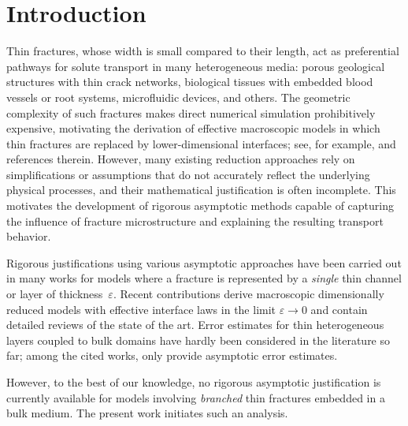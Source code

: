 \documentclass[reqno]{amsart}            %
\numberwithin{equation}{section}
\begin{document}
		
	
	
	\maketitle
	\tableofcontents
	
	
	
	\section{Introduction}
	
	Thin fractures, whose width is small compared to their length, act as preferential pathways for solute transport in many heterogeneous media: porous geological structures with thin crack networks, biological tissues with embedded blood vessels or root systems, microfluidic devices, and others. The geometric complexity of such fractures makes direct numerical simulation prohibitively expensive, motivating the derivation of effective macroscopic models in which thin fractures are replaced by lower-dimensional interfaces; see, for example, \cite{Ber-Grap-2022,Koch-2022,Wohl-2020} and references therein. However, many existing reduction approaches rely on simplifications or assumptions that do not accurately reflect the underlying physical processes, and their mathematical justification is often incomplete. This motivates the development of rigorous asymptotic methods capable of capturing the influence of fracture microstructure and explaining the resulting transport behavior.
	
	Rigorous justifications using various asymptotic approaches have been carried out in many works for models where a fracture is represented by a \emph{single} thin channel or layer of thickness~$\varepsilon$. Recent contributions \cite{Gahn-Radu-2018,Gahn-Jager-Radu-2022,Gahn-Jager-Radu-2021,Gahn-Radu-2025,Freud-Eden-2026,Hoerl-Rohde-2024,Lis-Kum-Pop-Rad-2020,Mel-Pop-Rohde-preprint-2026,Orl-Pan-2021} derive macroscopic dimensionally reduced models with effective interface laws in the limit $\varepsilon\to0$ and contain detailed reviews of the state of the art. Error estimates for thin heterogeneous layers coupled to bulk domains have hardly been considered in the literature so far; among the cited works, only \cite{Gahn-Jager-Radu-2021,Orl-Pan-2021,Mel-Pop-Rohde-preprint-2026} provide asymptotic error estimates.  
	
	However, to the best of our knowledge, no rigorous asymptotic justification is currently available for models involving \emph{branched} thin fractures embedded in a bulk medium. The present work initiates such an analysis.
	
\end{document}
